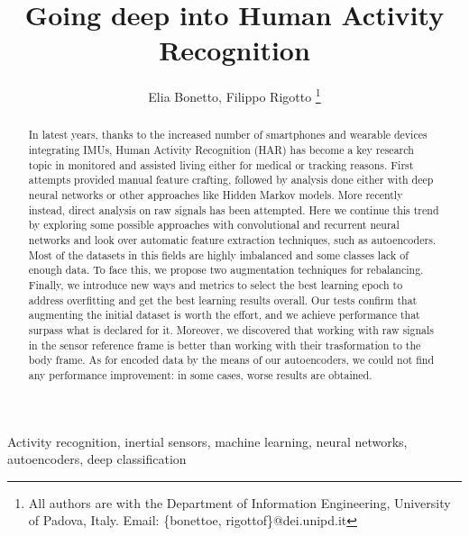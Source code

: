 \documentclass[10pt, conference, letterpaper]{IEEEtran}
\title{Going deep into Human Activity Recognition}
\author{Elia Bonetto, Filippo Rigotto
\thanks{All authors are with the Department of Information Engineering, University of Padova, Italy. Email: \{bonettoe, rigottof\}@dei.unipd.it}}
\newcommand\MR[1]{\textcolor{blue}{#1}}
\begin{document}
\maketitle

\begin{abstract}
In latest years, thanks to the increased number of smartphones and wearable devices integrating IMUs, Human Activity Recognition (HAR) has become a key research topic in monitored and assisted living either for medical or tracking reasons.
First attempts provided manual feature crafting, followed by analysis done either with deep neural networks or other approaches like Hidden Markov models.
More recently instead, direct analysis on raw signals has been attempted.
Here we continue this trend by exploring some possible approaches with convolutional and recurrent neural networks and look over automatic feature extraction techniques, such as autoencoders.
Most of the datasets in this fields are highly imbalanced and some classes lack of enough data.
To face this, we propose two augmentation techniques for rebalancing.
Finally, we introduce new ways and metrics to select the best learning epoch to address overfitting and get the best learning results overall.
Our tests confirm that augmenting the initial dataset is worth the effort, and we achieve performance that surpass what is declared for it.
Moreover, we discovered that working with raw signals in the sensor reference frame is better than working with their trasformation to the body frame.
As for encoded data by the means of our autoencoders, we could not find any performance improvement: in some cases, worse results are obtained.
\end{abstract}

\begin{IEEEkeywords}
Activity recognition, inertial sensors, machine learning, neural networks, autoencoders, deep classification
\end{IEEEkeywords}









\end{document}
